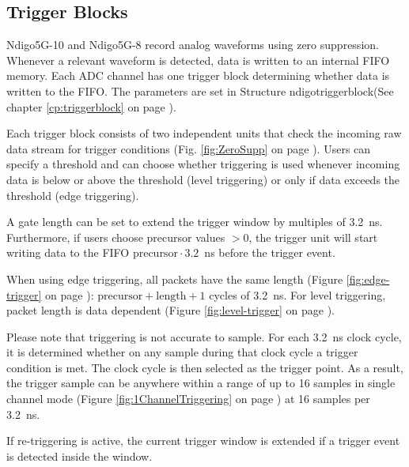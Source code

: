 \subsection{Trigger Blocks}

Ndigo5G-10 and Ndigo5G-8 record analog waveforms using zero suppression. Whenever a relevant waveform is detected, data is written to an internal FIFO memory. Each ADC channel has one trigger block determining whether data is written to the FIFO. The parameters are set in  Structure \textsf{ndigo\tu trigger\tu block}(See chapter \ref{cp:triggerblock} on page \pageref{cp:triggerblock}).\par

Each trigger block consists of two independent units that check the incoming raw data stream for trigger conditions (Fig. \ref{fig:ZeroSupp} on page \pageref{fig:ZeroSupp}). Users can specify a threshold and can choose whether triggering is used whenever incoming data is below or above the threshold (level triggering) or only if data exceeds the threshold (edge triggering).\par

A gate length can be set to extend the trigger window by multiples of 3.2~ns. Furthermore, if users choose precursor values $> 0$, the trigger unit will start writing data to the FIFO $\text{precursor}\cdot 3.2$~ns before the trigger event.\par

When using edge triggering, all packets have the same length (Figure \ref{fig:edge-trigger} on page \pageref{fig:edge-trigger}): $\text{precursor}+\text{length}+1$ cycles of 3.2~ns. For level triggering, packet length is data dependent (Figure \ref{fig:level-trigger} on page \pageref{fig:level-trigger}).\par

Please note that triggering is not accurate to sample. For each 3.2~ns clock cycle, it is determined whether on any sample during that clock cycle a trigger condition is met. The clock cycle is then selected as the trigger point. As a result, the trigger sample can be anywhere within a range of up to 16 samples in single channel mode (Figure \ref{fig:1ChannelTriggering} on page \pageref{fig:1ChannelTriggering}) at 16 samples per 3.2~ns.\par

If re-triggering is active, the current trigger window is extended if a trigger event is detected inside the window.\par

